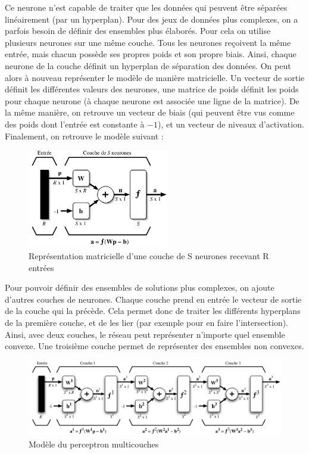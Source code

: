 Ce neurone n'est capable de traiter que les données qui peuvent être séparées linéairement (par un hyperplan). Pour des jeux de données plus complexes, on a parfois besoin de définir des ensembles plus élaborés.
Pour cela on utilise plusieurs neurones sur une même couche. Tous les neurones reçoivent la même entrée, mais chacun possède ses propres poids et son propre biais.
Ainsi, chaque neurone de la couche définit un hyperplan de séparation des données. On peut alors à nouveau représenter le modèle de manière matricielle.
Un vecteur de sortie définit les différentes valeurs des neurones, une matrice de poids définit les poids pour chaque neurone (à chaque neurone est associée une ligne de la matrice). De la même manière, on retrouve un vecteur de biais (qui peuvent être vus comme des poids dont l'entrée est constante à $-1$), et un vecteur de niveaux d'activation. Finalement, on retrouve le modèle suivant :

\begin{figure}[h]
 \centering
 \includegraphics[width=0.55\textwidth]{img/couche.png}
 \caption[Modèle d'une couche de neurones]{Représentation matricielle d'une couche de S neurones recevant R entrées}
\end{figure}

Pour pouvoir définir des ensembles de solutions plus complexes, on ajoute d'autres couches de neurones. Chaque couche prend en entrée le vecteur de sortie de la couche qui la précède. Cela permet donc de traiter les différents hyperplans de la première couche, et de les lier (par exemple pour en faire l'intersection). Ainsi, avec deux couches, le réseau peut représenter n'importe quel ensemble convexe. Une troisième couche permet de représenter des ensembles non convexes.

\begin{figure}[h]
 \centering
 \includegraphics[width=\textwidth]{img/modele_perceptron_multicouches.png}
 \caption{Modèle du perceptron multicouches}
\end{figure}


